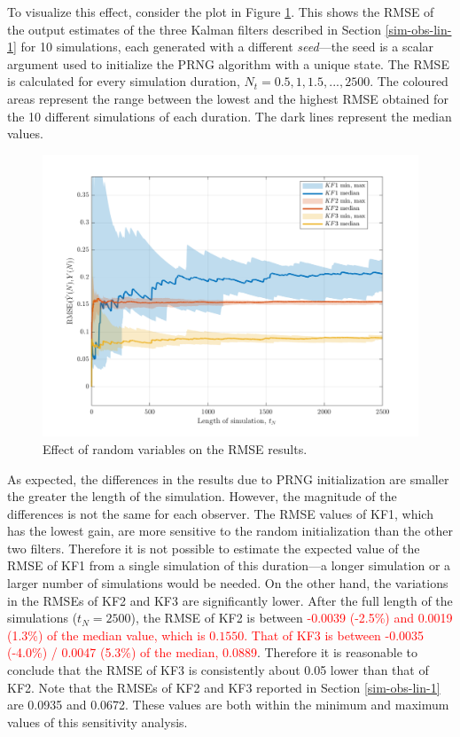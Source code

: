 {To visualize this effect, consider the plot in Figure \ref{fig:rod-obs-sim-1-3KF-seed-crmse-statsplot}. This shows the \gls{RMSE} of the output estimates of the three Kalman filters described in Section \ref{sim-obs-lin-1} for 10 simulations, each generated with a different \textit{seed}—the seed is a scalar argument used to initialize the PRNG algorithm with a unique state. The \gls{RMSE} is calculated for every simulation duration, $N_t=0.5,1,1.5,...,2500$. The coloured areas represent the range between the lowest and the highest \gls{RMSE} obtained for the 10 different simulations of each duration. The dark lines represent the median values.

\begin{figure}[htp]
	\centering
	\includegraphics[width=14cm]{images/rod_obs_sim1_3KF_seed_crmse_statsplot.pdf}
	\caption{Effect of random variables on the \gls{RMSE} results.}
	\label{fig:rod-obs-sim-1-3KF-seed-crmse-statsplot}
\end{figure}  %

As expected, the differences in the results due to PRNG initialization are smaller the greater the length of the simulation. However, the magnitude of the differences is not the same for each observer. The \gls{RMSE} values of KF1, which has the lowest gain, are more sensitive to the random initialization than the other two filters. Therefore it is not possible to estimate the expected value of the \gls{RMSE} of KF1 from a single simulation of this duration---a longer simulation or a larger number of simulations would be needed. On the other hand, the variations in the \gls{RMSE}s of KF2 and KF3 are significantly lower. After the full length of the simulations ($t_N=2500$), the RMSE of KF2 is between \textcolor{red}{-0.0039 (-2.5\%) and 0.0019 (1.3\%) of the median value, which is $0.1550$.  That of KF3 is between -0.0035 (-4.0\%) / 0.0047 (5.3\%) of the median, 0.0889}.  Therefore it is reasonable to conclude that the \gls{RMSE} of KF3 is consistently about 0.05 lower than that of KF2. Note that the \gls{RMSE}s of KF2 and KF3 reported in Section \ref{sim-obs-lin-1} are 0.0935 and 0.0672. These values are both within the minimum and maximum values of this sensitivity analysis.

}
